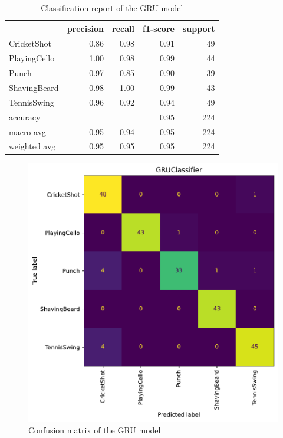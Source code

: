 \documentclass{article}
\begin{document}
\begin{table}[h]
    \label{clfrep:gru}
    \centering
    \begin{tabular}{lrrrr}
        \toprule
        & precision & recall & f1-score & support \\
        \midrule
        CricketShot & 0.86 & 0.98 & 0.91 & 49 \\
        PlayingCello & 1.00 & 0.98 & 0.99 & 44 \\
        Punch & 0.97 & 0.85 & 0.90 & 39 \\
        ShavingBeard & 0.98 & 1.00 & 0.99 & 43 \\
        TennisSwing & 0.96 & 0.92 & 0.94 & 49 \\
        \midrule
        accuracy &  &  & 0.95 & 224 \\
        macro avg & 0.95 & 0.94 & 0.95 & 224 \\
        weighted avg & 0.95 & 0.95 & 0.95 & 224 \\
        \bottomrule
    \end{tabular}
    \caption{Classification report of the GRU model}
\end{table}

\begin{figure}[h]
    \label{fig:confmat_gru}
    \centering
    \includegraphics[scale=0.5]{./rnn/confusion_matrix.pdf}
    \caption{Confusion matrix of the GRU model}
\end{figure}
\end{document}

